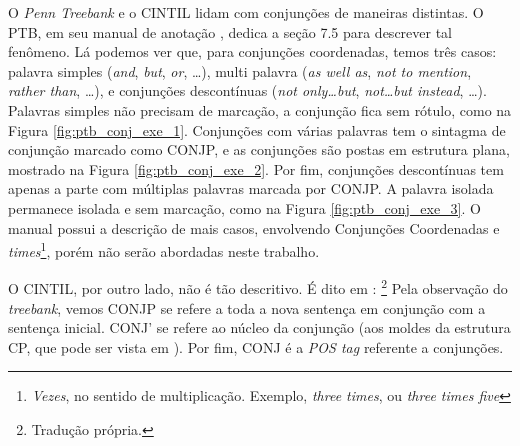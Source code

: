 O \textit{Penn Treebank} e o CINTIL lidam com conjunções de maneiras distintas. O PTB, em seu manual de anotação \cite[p~117]{bracketing_ptb}, dedica a seção 7.5 para descrever tal fenômeno. Lá podemos ver que, para conjunções coordenadas, temos três casos: palavra simples (\textit{and}, \textit{but}, \textit{or}, \ldots), multi palavra (\textit{as well as}, \textit{not to mention}, \textit{rather than}, \ldots), e conjunções descontínuas (\textit{not only\ldots but}, \textit{not\ldots but instead}, \ldots). Palavras simples não precisam de marcação, a conjunção fica sem rótulo, como na Figura \ref{fig:ptb_conj_exe_1}. Conjunções com várias palavras tem o sintagma de conjunção marcado como CONJP, e as conjunções são postas em estrutura plana, mostrado na Figura \ref{fig:ptb_conj_exe_2}. Por fim, conjunções descontínuas tem apenas a parte com múltiplas palavras marcada por CONJP. A palavra isolada permanece isolada e sem marcação, como na Figura \ref{fig:ptb_conj_exe_3}. O manual possui a descrição de mais casos, envolvendo Conjunções Coordenadas e \textit{times}\footnote{\textit{Vezes}, no sentido de multiplicação. Exemplo, \textit{three times}, ou \textit{three times five}}, 
porém não serão abordadas neste trabalho.
\begin{center}

\end{center}
\begin{center}

\end{center}
\begin{center}

\end{center}

O CINTIL, por outro lado, não é tão descritivo. É dito em \cite[p~20]{cintil_handbook}:
\footnote{ Tradução própria.}
Pela observação do \textit{treebank}, vemos CONJP se refere a toda a nova sentença em conjunção com a sentença inicial. CONJ’ se refere ao núcleo da conjunção (aos moldes da estrutura CP, que pode ser vista em \cite[p~63]{mioto2013novo}). Por fim, CONJ é a \textit{POS tag} referente a conjunções.

